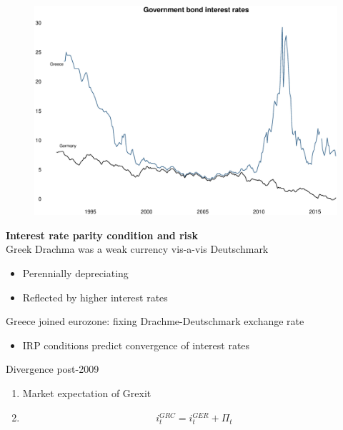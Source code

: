 \documentclass{beamer}
\begin{document}
\begin{frame}
  \begin{figure}
    \includegraphics[scale=.3]{government_bonds.eps}
  \end{figure}
\end{frame}

\begin{frame}
  \textbf{Interest rate parity condition and risk}\\
  Greek Drachma was a weak currency vis-a-vis Deutschmark
  \begin{itemize}
    \item Perennially depreciating
    \item Reflected by higher interest rates
  \end{itemize}
   Greece joined eurozone: fixing Drachme-Deutschmark exchange rate
  \begin{itemize}
    \item IRP conditions predict convergence of interest rates
  \end{itemize}
  \medskip  
  Divergence post-2009
  \begin{enumerate}
    \item Market expectation of Grexit
    \item \begin{align*} i^{GRC}_t = i^{GER}_t + \Pi_t    \end{align*}
 \end{enumerate}
\end{frame}
\end{document}
